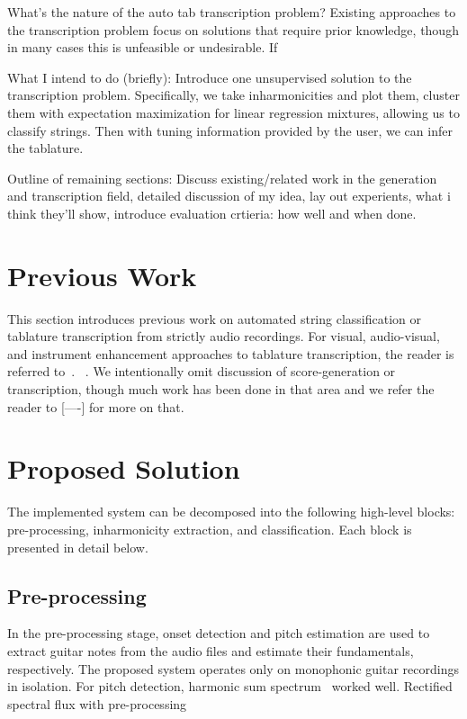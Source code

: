 \documentclass[12pt]{cmuthesis}
\begin{document}
What's the nature of the auto tab transcription problem? Existing approaches to the transcription problem focus on solutions that require prior knowledge, though in many cases this is unfeasible or undesirable. If

What I intend to do (briefly): Introduce one unsupervised solution to the transcription problem. Specifically, we take inharmonicities and plot them, cluster them with expectation maximization for linear regression mixtures, allowing us to classify strings. Then with tuning information provided by the user, we can infer the tablature.

Outline of remaining sections: Discuss existing/related work in the generation and transcription field, detailed discussion of my idea, lay out experients, what i think they'll show, introduce evaluation crtieria: how well and when done.

\singlespacing

\chapter{Previous Work}
This section introduces previous work on automated string classification or tablature transcription from strictly audio recordings. For visual, audio-visual, and instrument enhancement approaches to tablature transcription, the reader is referred to~\cite{ogrady2009, hrybyk2010}. ~\cite{abesser2012}. We intentionally omit discussion of score-generation or transcription, though much work has been done in that area and we refer the reader to [----] for more on that. \cite{barbanchoa2012,barbanchoi2012}
\cite{barbancho2009}



\chapter{Proposed Solution}
The implemented system can be decomposed into the following high-level blocks: pre-processing, inharmonicity extraction, and classification. Each block is presented in detail below.

\section{Pre-processing}
In the pre-processing stage, onset detection and pitch estimation are used to extract guitar notes from the audio files and estimate their fundamentals, respectively. The proposed system operates only on monophonic guitar recordings in isolation. For pitch detection, harmonic sum spectrum~\cite{noll1969} worked well. Rectified spectral flux with pre-processing~\cite{bello2005,dixon2006}
\end{document}
